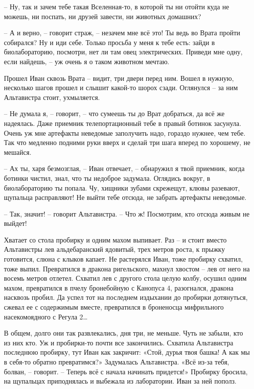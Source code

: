 \documentclass[ebook,oneside,final,openright]{memoir}
\begin{document}
– Ну, так и зачем тебе такая Вселенная-то, в которой ты ни отойти куда не можешь, ни поспать, ни друзей завести, ни животных домашних? \par
– А и верно, – говорит страж, – незачем мне всё это! Ты ведь во Врата пройти собирался? Ну и иди себе. Только просьба у меня к тебе есть: зайди в биолабораторию, посмотри, нет ли там овец электрических. Приведи мне одну, если найдешь, – уж очень я о таком животном мечтаю.\par
\par
\par
Прошел Иван сквозь Врата – видит, три двери перед ним. Вошел в нужную, несколько шагов прошел и слышит какой-то шорох сзади. Оглянулся – за ним Альтавистра стоит, ухмыляется. \par
\par
– Не думала я, – говорит, – что сумеешь ты до Врат добраться, да всё же надеялась. Даже приемник телепортационный тебе в правый ботинок засунула. Очень уж мне артефакты неведомые заполучить надо, гораздо нужнее, чем тебе. Так что медленно подними руки вверх и сделай три шага вперед по хорошему, не мешайся.\par
– Ах ты, харя безмозглая, – Иван отвечает, – обнаружил я твой приемник, когда ботинки чистил, знал, что ты недоброе задумала. Оглядись вокруг, в биолабораторию ты попала. Чу, хищники зубами скрежещут, клювы разевают, щупальца расправляют! Не выйти тебе отсюда, не забрать артефакты неведомые.\par
– Так, значит! – говорит Альтавистра. – Что ж! Посмотрим, кто отсюда живым не выйдет!\par
\par
Хватает со стола пробирку и одним махом выпивает. Раз – и стоит вместо Альтавистры лев альдебаранский ядовитый, трех метров роста, к прыжку готовится, слюна с клыков капает. Не растерялся Иван, тоже пробирку схватил, тоже выпил. Превратился в дракона ригельского, махнул хвостом – лев от него на восемь метров отлетел. Схватил лев с другого стола целую колбу, осушил одним махом, превратился в пчелу бронебойную с Канопуса 4, разогнался, дракона насквозь пробил. Да успел тот на последнем издыхании до пробирки дотянуться, сжевал ее с содержимым вместе, превратился в броненосца мифрильного насекомоядного с Регула 2…\par
\par
В общем, долго они так развлекались, дня три, не меньше. Чуть не забыли, кто из них кто. Уж и пробирки-то почти все закончились. Схватила Альтавистра последнюю пробирку, тут Иван как закричит: «Стой, дурья твоя башка! А как мы в себя-то обратно превратимся?» Задумалась Альтавистра. «Всё из-за тебя, болван, – говорит. – Теперь всё с начала начинать придется!» Пробирку бросила, на щупальцах приподнялась и выбежала из лаборатории. Иван за ней пополз.\par
\end{document}
